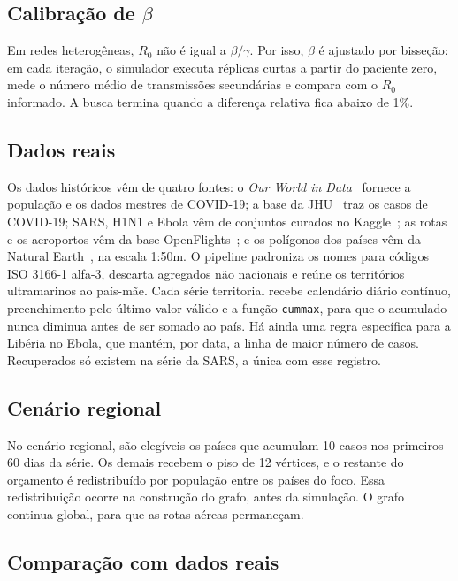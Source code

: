 \documentclass[11pt]{article}
\begin{document}
\subsection{Calibração de $\beta$}

Em redes heterogêneas, $R_0$ não é igual a $\beta/\gamma$. Por isso, $\beta$ é ajustado por bisseção: em cada iteração, o simulador executa réplicas curtas a partir do paciente zero, mede o número médio de transmissões secundárias e compara com o $R_0$ informado. A busca termina quando a diferença relativa fica abaixo de 1\%.

\subsection{Dados reais}

Os dados históricos vêm de quatro fontes: o \emph{Our World in Data}~\cite{owid_covid_2023} fornece a população e os dados mestres de COVID-19; a base da JHU~\cite{jhu_kaggle_covid} traz os casos de COVID-19; SARS, H1N1 e Ebola vêm de conjuntos curados no Kaggle~\cite{kaggle_sars,kaggle_h1n1,kaggle_ebola}; as rotas e os aeroportos vêm da base OpenFlights~\cite{openflights}; e os polígonos dos países vêm da Natural Earth~\cite{natural_earth}, na escala 1:50m. O pipeline padroniza os nomes para códigos ISO 3166-1 alfa-3, descarta agregados não nacionais e reúne os territórios ultramarinos ao país-mãe. Cada série territorial recebe calendário diário contínuo, preenchimento pelo último valor válido e a função \texttt{cummax}, para que o acumulado nunca diminua antes de ser somado ao país. Há ainda uma regra específica para a Libéria no Ebola, que mantém, por data, a linha de maior número de casos. Recuperados só existem na série da SARS, a única com esse registro.

\subsection{Cenário regional}

No cenário regional, são elegíveis os países que acumulam 10 casos nos primeiros 60 dias da série. Os demais recebem o piso de 12 vértices, e o restante do orçamento é redistribuído por população entre os países do foco. Essa redistribuição ocorre na construção do grafo, antes da simulação. O grafo continua global, para que as rotas aéreas permaneçam.

\subsection{Comparação com dados reais}
\end{document}
